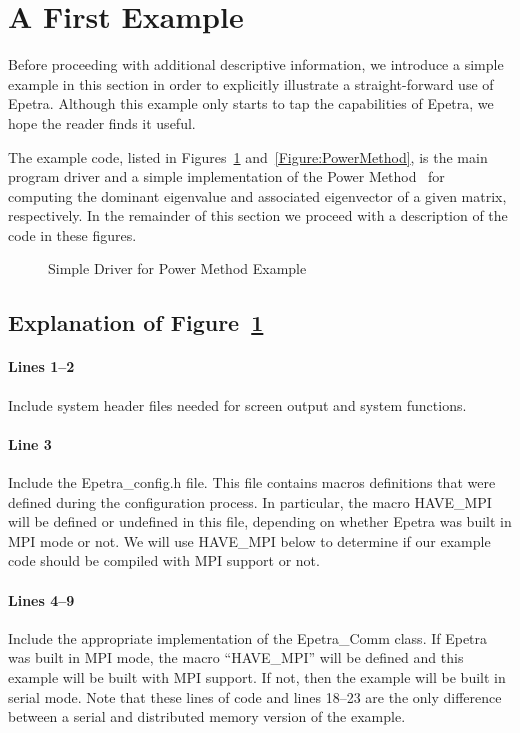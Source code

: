 \documentclass[12pt,relax]{EpetraUserGuide}
\newcommand{\comm}{Epetra\_Comm}
\begin{document}
\section{A First Example}
\label{Section:FirstExample}
Before proceeding with additional descriptive information, we
introduce a simple example in this section in order to explicitly
illustrate a straight-forward use of Epetra.  Although this example only
starts to tap the capabilities of Epetra, we hope the reader finds it
useful.

The example code, listed in Figures~\ref{Figure:FirstExample}
and~\ref{Figure:PowerMethod}, is the main program driver and
a simple implementation of the Power Method~\cite{GoluVanL96} for computing the dominant
eigenvalue and associated eigenvector of a given matrix,
respectively.  In the remainder of this section we proceed with a
description of the code in these figures.
\begin{figure}
\begin{center}

\end{center}
\caption{\label{Figure:FirstExample} Simple Driver for Power Method Example}
\end{figure}

\subsection{Explanation of Figure~\ref{Figure:FirstExample}}

\paragraph{Lines 1--2}
Include system header files needed for screen output and system
functions.
\paragraph{Line 3}
Include the Epetra\_config.h file.  This file contains macros
definitions that were defined during the configuration process.  In
particular, the macro HAVE\_MPI will be defined or undefined in this
file, depending on whether Epetra was built in MPI mode or not.  We
will use HAVE\_MPI below to determine if our example code should be
compiled with MPI support or not.
\paragraph{Lines 4--9}
Include the appropriate implementation of the \comm{} class.  If
Epetra was built in MPI mode, the macro ``HAVE\_MPI'' will be defined
and this example will be built with MPI support.  If not, then the
example will be built in serial mode.  Note that these lines of code
 and lines 18--23 are the only difference between a serial and distributed memory
version of the example. 
\end{document}
